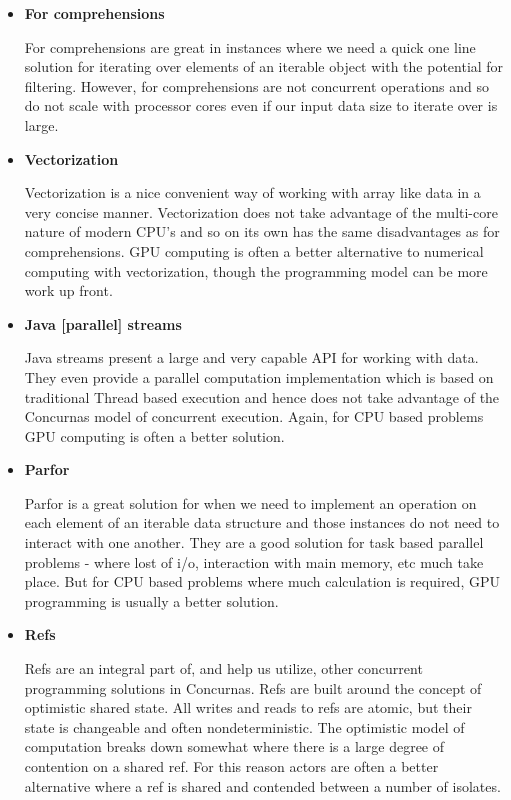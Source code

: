 \documentclass[conc-doc]{subfiles}
\begin{document}
\begin{itemize}
	\item \textbf{For comprehensions}
	
		For comprehensions are great in instances where we need a quick one line solution for iterating over elements of an iterable object with the potential for filtering. However, for comprehensions are not concurrent operations and so do not scale with processor cores even if our input data size to iterate over is large.
		
	\item \textbf{Vectorization}
	
		Vectorization is a nice convenient way of working with array like data in a very concise manner. Vectorization does not take advantage of the multi-core nature of modern CPU's and so on its own has the same disadvantages as for comprehensions. GPU computing is often a better alternative to numerical computing with vectorization, though the programming model can be more work up front.
		
	\item \textbf{Java [parallel] streams}
	
		Java streams present a large and very capable API for working with data. They even provide a parallel computation implementation which is based on traditional Thread based execution and hence does not take advantage of the Concurnas model of concurrent execution. Again, for CPU based problems GPU computing is often a better solution.		
		
	\item \textbf{Parfor}
	
		Parfor is a great solution for when we need to implement an operation on each element of an iterable data structure and those instances do not need to interact with one another. They are a good solution for task based parallel problems - where lost of i/o, interaction with main memory, etc much take place. But for CPU based problems where much calculation is required, GPU programming is usually a better solution.
		
	\item \textbf{Refs}
	
		Refs are an integral part of, and help us utilize, other concurrent programming solutions in Concurnas. Refs are built around the concept of optimistic shared state. All writes and reads to refs are atomic, but their state is changeable and often nondeterministic. The optimistic model of computation breaks down somewhat where there is a large degree of contention on a shared ref. For this reason actors are often a better alternative where a ref is shared and contended between a number of isolates.
		

\end{itemize}
\end{document}

